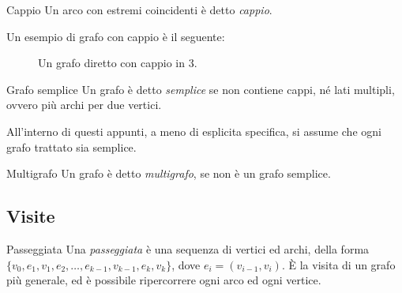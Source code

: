 \documentclass[a4paper, 12pt]{report}
\begin{document}
    \begin{frameddefn}{Cappio}
        Un arco con estremi coincidenti è detto \textit{cappio}.
    \end{frameddefn}

    \begin{example}
        Un esempio di grafo con cappio è il seguente:

        \begin{figure}[H]
            \centering
            \caption{Un grafo diretto con cappio in 3.}
        \end{figure}
    \end{example}

    \begin{frameddefn}{Grafo semplice}
        Un grafo è detto \textit{semplice} se non contiene cappi, né lati multipli, ovvero più archi per due vertici.

        All'interno di questi appunti, a meno di esplicita specifica, si assume che ogni grafo trattato sia semplice.
    \end{frameddefn}

    \begin{frameddefn}{Multigrafo}
        Un grafo è detto \textit{multigrafo}, se non è un grafo semplice.
    \end{frameddefn}

    \subsection{Visite}

    \begin{frameddefn}{Passeggiata}
        Una \textit{passeggiata} è una sequenza di vertici ed archi, della forma $\{v_0, e_1, v_1, e_2, \ldots , e_{k - 1}, v_{k - 1}, e_k, v_k\}$, dove $e_i=(v_{i - 1}, v_i)$. È la visita di un grafo più generale, ed è possibile ripercorrere ogni arco ed ogni vertice.
    \end{frameddefn}
\end{document}
